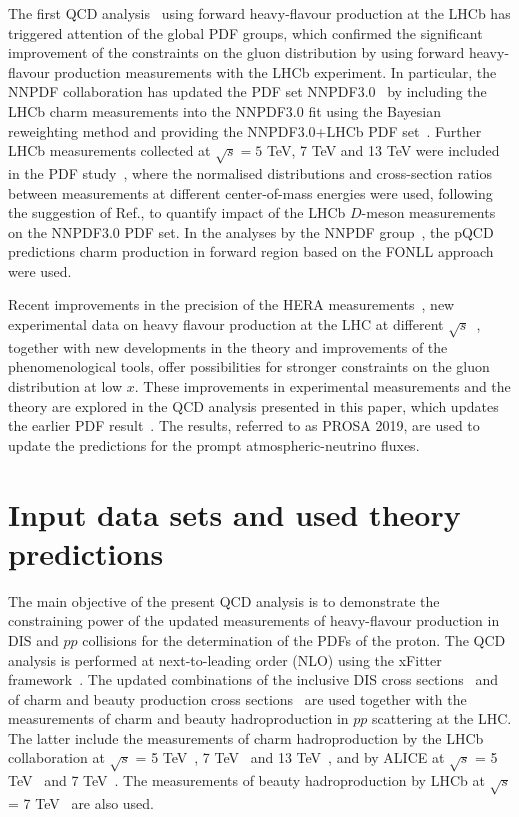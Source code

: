 The first QCD analysis~\cite{Zenaiev:2015rfa} using forward heavy-flavour production at the LHCb has triggered attention of the global PDF groups, which confirmed the significant improvement of the constraints on the gluon distribution by using forward heavy-flavour production measurements with the LHCb experiment. In particular, the NNPDF collaboration has updated the PDF set NNPDF3.0~\cite{Ball:2014uwa} by including the LHCb charm measurements into the NNPDF3.0 fit using the Bayesian reweighting method and providing the NNPDF3.0+LHCb PDF set~\cite{Gauld:2015yia}. Further LHCb measurements collected at $\sqrt{s}=5$ TeV, 7 TeV and 13 TeV were included in the PDF study~\cite{Gauld:2016kpd}, where the normalised distributions and cross-section ratios between measurements at different center-of-mass energies were used, following the suggestion of Ref.\cite{Cacciari:2015fta}, to quantify impact of the LHCb $D$-meson measurements on the NNPDF3.0 PDF set. In the analyses by the NNPDF group~\cite{Gauld:2015yia,Gauld:2016kpd}, the pQCD predictions charm production in forward region based on the FONLL approach~\cite{Cacciari:1993mq} were used.  


Recent improvements in the precision of the HERA measurements~\cite{Abramowicz:2015mha,H1:2018flt}, new experimental data on heavy flavour production at the LHC at 
different $\sqrt{s}$~\cite{Aaij:2015bpa,Aaij:2016jht,Acharya:2017jgo,Acharya:2019mgn}, together with new developments in the theory and improvements of the phenomenological tools, offer 
possibilities for stronger constraints on the gluon distribution at low $x$. These improvements in experimental measurements 
and the theory are explored in the QCD analysis presented in this paper, which updates the earlier PDF result~\cite{Zenaiev:2015rfa}. The results, referred to as PROSA 2019, are used to update the predictions for the prompt atmospheric-neutrino fluxes. 


\section{Input data sets and used theory predictions}
\label{sec:qcdanalysis}

The main objective of the present QCD analysis is to demonstrate the constraining power of the updated measurements of 
heavy-flavour production in DIS and $pp$ collisions for the determination of the PDFs of the proton. 
The QCD analysis is performed at next-to-leading order (NLO) using the xFitter framework~\cite{Alekhin:2014irh}. 
The updated combinations of the inclusive DIS cross sections~\cite{Abramowicz:2015mha} and of charm and beauty production cross sections~\cite{H1:2018flt} are used together with the measurements of charm and beauty hadroproduction in $pp$ scattering at the LHC. The latter include the measurements of charm hadroproduction by the LHCb collaboration at $\sqrt{s}$ = 5 TeV~\cite{Aaij:2016jht}, 7 TeV~\cite{Aaij:2013mga} and 13 TeV~\cite{Aaij:2015bpa}, and by ALICE at $\sqrt{s}$ = 5 TeV~\cite{Acharya:2019mgn} and 7 TeV~\cite{Acharya:2017jgo}. The measurements of beauty hadroproduction by LHCb at $\sqrt{s}$ = 7 TeV~\cite{Aaij:2013noa} are also used.

